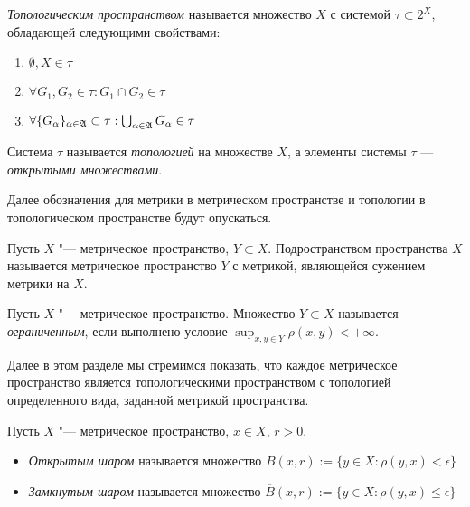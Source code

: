 \begin{definition}
	\textit{Топологическим пространством} называется множество $X$ с системой $\tau \subset 2^X$, обладающей следующими свойствами:
	\begin{enumerate}
		\item $\emptyset, X \in \tau$
		\item $\forall G_1, G_2 \in \tau: G_1 \cap G_2 \in \tau$
		\item $\forall \{G_\alpha\}_{\alpha \in \mathfrak A} \subset \tau: \bigcup_{\alpha \in \mathfrak A}G_\alpha\in \tau$
	\end{enumerate}
	
	Система $\tau$ называется \textit{топологией} на множестве $X$, а элементы системы $\tau$ --- \textit{открытыми множествами}.
\end{definition}

\begin{note}
	Далее обозначения для метрики в метрическом пространстве и топологии в топологическом пространстве будут опускаться.
\end{note}

\begin{definition}
	Пусть $X$ "--- метрическое пространство, $Y \subset X$. Подространством пространства $X$ называется метрическое пространство $Y$ с метрикой, являющейся сужением метрики на $X$.
\end{definition}

\begin{definition}
	Пусть $X$ "--- метрическое пространство. Множество $Y \subset X$ называется \textit{ограниченным}, если выполнено условие $\sup_{x, y \in Y} \rho(x, y) < +\infty$.
\end{definition}

\begin{note}
	Далее в этом разделе мы стремимся показать, что каждое метрическое пространство является топологическими пространством с топологией определенного вида, заданной метрикой пространства.
\end{note}

\begin{definition}
	Пусть $X$ "--- метрическое пространство, $x \in X$, $r > 0$.
	\begin{itemize}
		\item \textit{Открытым шаром} называется множество $B(x, r) := \{y \in X: \rho(y, x) < \epsilon\}$
		
		\item \textit{Замкнутым шаром} называется множество $\overline B(x, r) := \{y \in X: \rho(y, x) \le \epsilon\}$
	\end{itemize}
\end{definition}

